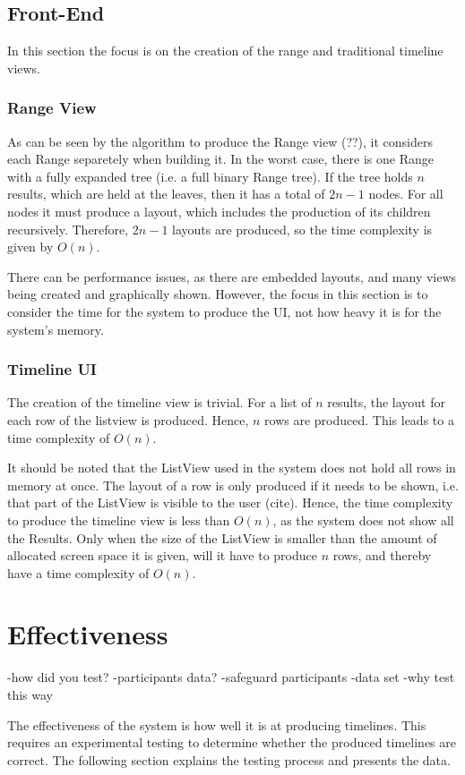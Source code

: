 \subsection{Front-End}
\par In this section the focus is on the creation of the range and traditional timeline views.
\subsubsection{Range View}
\par As can be seen by the algorithm to produce the Range view (??), it considers each Range separetely when building it. In the worst case, there is one Range with a fully expanded tree (i.e. a full binary Range tree). If the tree holds $n$ results, which are held at the leaves, then it has a total of $2n-1$ nodes. For all nodes it must produce a layout, which includes the production of its children recursively. Therefore, $2n-1$ layouts are produced, so the time complexity is given by $O(n)$. 
\par There can be performance issues, as there are embedded layouts, and many views being created and graphically shown. However, the focus in this section is to consider the time for the system to produce the UI, not how heavy it is for the system's memory.
\subsubsection{Timeline UI}
\par The creation of the timeline view is trivial. For a list of $n$ results, the layout for each row of the listview is produced. Hence, $n$ rows are produced. This leads to a time complexity of $O(n)$.
\par It should be noted that the ListView used in the system does not hold all rows in memory at once. The layout of a row is only produced if it needs to be shown, i.e. that part of the ListView is visible to the user (cite). Hence, the time complexity to produce the timeline view is less than $O(n)$, as the system does not show all the Results. Only when the size of the ListView is smaller than the amount of allocated screen space it is given, will it have to produce $n$ rows, and thereby have a time complexity of $O(n)$.
\section{Effectiveness}
-how did you test?
-participants data?
-safeguard participants
-data set
-why test this way
\par The effectiveness of the system is how well it is at producing timelines. This requires an experimental testing to determine whether the produced timelines are correct. The following section explains the testing process and presents the data.
